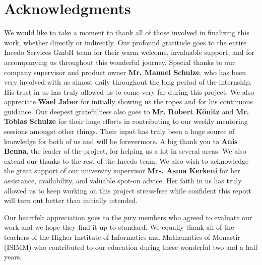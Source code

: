 \section*{Acknowledgments}

We would like to take a moment to thank all of those involved in finalizing this work, whether directly or indirectly. Our profound gratitude goes to the entire Incedo Services GmbH team for their warm welcome, invaluable support, and for accompanying us throughout this wonderful journey. Special thanks to our company supervisor and product owner \textbf{Mr. Manuel Schulze}, who has been very involved with us almost daily throughout the long period of the internship. His trust in us has truly allowed us to come very far during this project. We also appreciate \textbf{Wael Jaber} for initially showing us the ropes and for his continuous guidance. Our deepest gratefulness also goes to \textbf{Mr. Robert Könitz} and \textbf{Mr. Tobias Schulze} for their huge efforts in contributing to our weekly mentoring sessions amongst other things. Their input has truly been a huge source of knowledge for both of us and will be forevermore. A big thank you to \textbf{Anis Benna}, the leader of the project, for helping us a lot in several areas. We also extend our thanks to the rest of the Incedo team. We also wish to acknowledge the great support of our university supervisor \textbf{Mrs. Asma Kerkeni} for her assistance, availability, and valuable spot-on advice. Her faith in us has truly allowed us to keep working on this project stress-free while confident this report will turn out better than initially intended.


Our heartfelt appreciation goes to the jury members who agreed to evaluate
our work and we hope they find it up to standard. We equally thank all
of the teachers of the  Higher Institute of Informatics and Mathematics of Monastir (ISIMM) who contributed to our education during these wonderful two and
a half years.
\newpage
